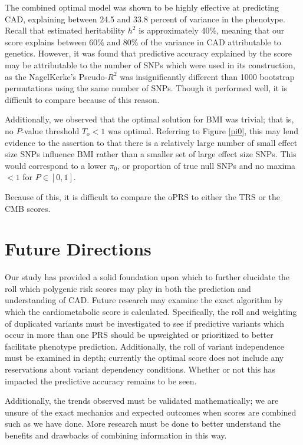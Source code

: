 The combined optimal model was shown to be highly effective at predicting \ac{CAD}, explaining between 24.5 and 33.8 percent of variance in the phenotype. Recall that estimated heritability $h^2$ is approximately 40\%, meaning that our score explains between 60\% and 80\% of the variance in \ac{CAD} attributable to genetics. However, it was found that predictive accuracy explained by the score may be attributable to the number of \acp{SNP} which were used in its construction, as the NagelKerke's Pseudo-$R^2$ was insignificantly different than 1000 bootstrap permutations using the same number of \acp{SNP}. Though it performed well, it is difficult to compare because of this reason. 

Additionally, we observed that the optimal solution for \ac{BMI} was trivial; that is, no $P$-value threshold $T_o <1$ was optimal. Referring to Figure \ref{pi0}, this may lend evidence to the assertion to that there is a relatively large number of small effect size \acp{SNP} influence \ac{BMI} rather than a smaller set of large effect size \acp{SNP}. This would correspond to a lower $\pi_0$, or proportion of true null \acp{SNP} and no maxima $< 1$ for $P \in [0,1]$.

Because of this, it is difficult to compare the \ac{oPRS} to either the \ac{TRS} or the \ac{CMB} scores. 

\section{Future Directions} 

Our study has provided a solid foundation upon which to further elucidate the roll which polygenic risk scores may play in both the prediction and understanding of \ac{CAD}. Future research may examine the exact algorithm by which the cardiometabolic score is calculated. Specifically, the roll and weighting of duplicated variants must be investigated to see if predictive variants which occur in more than one \ac{PRS} should be upweighted or prioritized to better facilitate phenotype prediction. Additionally, the roll of variant independence must be examined in depth; currently the optimal score does not include any reservations about variant dependency conditions. Whether or not this has impacted the predictive accuracy remains to be seen.

Additionally, the trends observed must be validated mathematically; we are unsure of the exact mechanics and expected outcomes when scores are combined such as we have done. More research must be done to better understand the benefits and drawbacks of combining information in this way. 